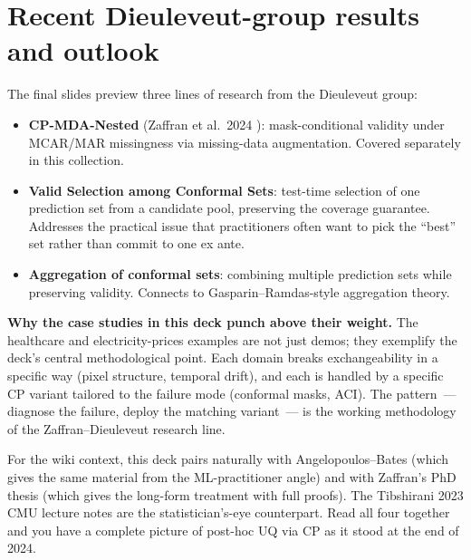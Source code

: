 \documentclass[letterpaper,11pt,leqno]{article}
\newcommand{\bib}{paper.bib}
\begin{document}
\section{Recent Dieuleveut-group results and outlook}\label{s:discussion}

The final slides preview three lines of research from the Dieuleveut group:

\begin{itemize}
\item \textbf{CP-MDA-Nested} (Zaffran et al.\ 2024 \cite{zaffran2024missing}): mask-conditional validity under MCAR/MAR missingness via missing-data augmentation. Covered separately in this collection.
\item \textbf{Valid Selection among Conformal Sets}: test-time selection of one prediction set from a candidate pool, preserving the coverage guarantee. Addresses the practical issue that practitioners often want to pick the ``best'' set rather than commit to one ex ante.
\item \textbf{Aggregation of conformal sets}: combining multiple prediction sets while preserving validity. Connects to Gasparin--Ramdas-style aggregation theory.
\end{itemize}

\begin{keyinsight}
\textbf{Why the case studies in this deck punch above their weight.} The healthcare and electricity-prices examples are not just demos; they exemplify the deck's central methodological point. Each domain breaks exchangeability in a specific way (pixel structure, temporal drift), and each is handled by a specific CP variant tailored to the failure mode (conformal masks, ACI). The pattern~--- diagnose the failure, deploy the matching variant~--- is the working methodology of the Zaffran--Dieuleveut research line.
\end{keyinsight}

For the wiki context, this deck pairs naturally with Angelopoulos--Bates \cite{angelopoulos2022gentle} (which gives the same material from the ML-practitioner angle) and with Zaffran's PhD thesis \cite{zaffran2024phd} (which gives the long-form treatment with full proofs). The Tibshirani 2023 CMU lecture notes are the statistician's-eye counterpart. Read all four together and you have a complete picture of post-hoc UQ via CP as it stood at the end of 2024.


\end{document}
